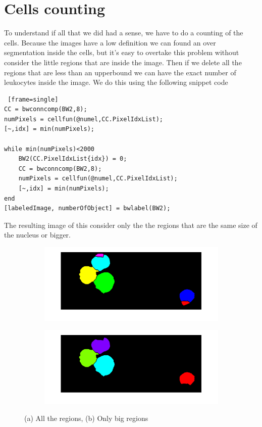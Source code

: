 \section{Cells counting}
To understand if all that we did had a sense, we have to do a counting of the cells. Because the images have a low definition we can found an over segmentation inside the cells, but it's easy to overtake this problem without consider the little regions that are inside the image. Then if we delete all the regions that are less than an upperbound we can have the exact number of leukocytes inside the image. We do this using the following snippet code
\begin{scriptsize}
	\begin{lstlisting} [frame=single]
CC = bwconncomp(BW2,8);
numPixels = cellfun(@numel,CC.PixelIdxList);
[~,idx] = min(numPixels);

while min(numPixels)<2000
    BW2(CC.PixelIdxList{idx}) = 0;
    CC = bwconncomp(BW2,8);
    numPixels = cellfun(@numel,CC.PixelIdxList);
    [~,idx] = min(numPixels);
end
[labeledImage, numberOfObject] = bwlabel(BW2);
	\end{lstlisting}
\end{scriptsize}
The resulting image of this consider only the the regions that are the same size of the nucleus or bigger.
\begin{figure}
	\centering
	\begin{subfigure}[b]{0.6\textwidth}
        \includegraphics[width=\textwidth]{img/celluleConCito.png}
        \caption{ }
        \label{fig:alltheregions}
    \end{subfigure}
    \begin{subfigure}[b]{0.6\textwidth}
		\includegraphics[width=\textwidth]{img/conteggioNuclei(noWatersheed).png}
		\caption{ }
		\label{fig:onlybigregions}
	\end{subfigure}
	\caption{(a) All the regions, (b) Only big regions}
	\label{fig:counting}
\end{figure}